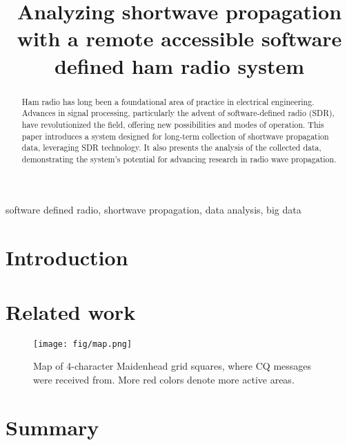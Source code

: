 \documentclass[conference]{IEEEtran}
\begin{document}
\title{Analyzing shortwave propagation with a remote accessible software defined ham radio system}

\author{
\and
{}
}

\maketitle

\begin{abstract}
Ham radio has long been a foundational area of practice in electrical
  engineering. Advances in signal processing, particularly the advent of
  software-defined radio (SDR), have revolutionized the field, offering new
  possibilities and modes of operation. This paper introduces a system designed
  for long-term collection of shortwave propagation data, leveraging SDR
  technology. It also presents the analysis of the collected data,
  demonstrating the system's potential for advancing research in radio wave
  propagation.
\end{abstract}

\begin{IEEEkeywords}
software defined radio, shortwave propagation, data analysis, big data
\end{IEEEkeywords}

\section{Introduction}

\cite{ga-vrp}

\section{Related work}

\begin{figure}[htbp]
	\centering
	\texttt{[image: fig/map.png]}
	\caption{Map of 4-character Maidenhead grid squares, where CQ messages were received from.
  More red colors denote more active areas.}
	\label{fig-dummy}
\end{figure}

\section{Summary}




\end{document}
